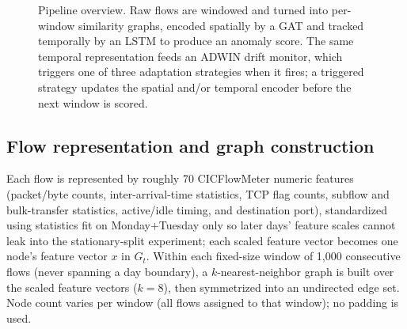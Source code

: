 \documentclass[twocolumn]{llncs}
\begin{document}
\begin{figure}[t]
\centering
{}
\caption{Pipeline overview. Raw flows are windowed and turned into per-window similarity graphs,
encoded spatially by a GAT and tracked temporally by an LSTM to produce an anomaly score. The same
temporal representation feeds an ADWIN drift monitor, which triggers one of three adaptation
strategies when it fires; a triggered strategy updates the spatial and/or temporal encoder before
the next window is scored.}
\label{fig:pipeline}
\end{figure}

\subsection{Flow representation and graph construction}
Each flow is represented by roughly 70 CICFlowMeter numeric features (packet/byte counts,
inter-arrival-time statistics, TCP flag counts, subflow and bulk-transfer statistics, active/idle
timing, and destination port), standardized using statistics fit on Monday+Tuesday only so later
days' feature scales cannot leak into the stationary-split experiment; each scaled feature vector
becomes one node's feature vector $x$ in $G_t$. Within each fixed-size window of 1{,}000
consecutive flows (never spanning a day boundary), a $k$-nearest-neighbor graph is built over the
scaled feature vectors ($k=8$), then symmetrized into an undirected edge set. Node count varies per
window (all flows assigned to that window); no padding is used.
\end{document}

